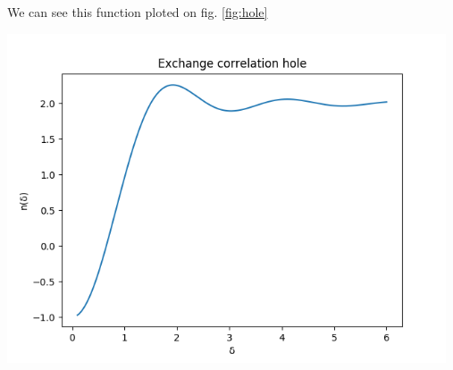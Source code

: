 \begin{questions}
\begin{solution}
 We can see this function ploted on fig. \ref{fig:hole}

 \begin{center}
   \includegraphics[width=130mm]{hole}
 \end{center}

 \label{fig:hole}\vspace{0.5cm}
 \end{solution}
\end{questions}

%
%

